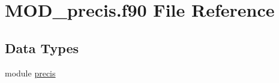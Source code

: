 \hypertarget{MOD__precis_8f90}{\section{M\-O\-D\-\_\-precis.\-f90 File Reference}
\label{MOD__precis_8f90}
}
\subsection*{Data Types}
\begin{DoxyCompactItemize}
\item 
module \hyperlink{classprecis}{precis}
\end{DoxyCompactItemize}
